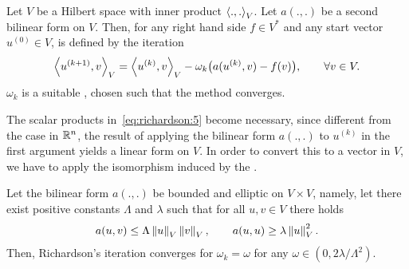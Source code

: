 \begin{definition}
  Let $V$ be a Hilbert space with inner product $\scal(.,.)_V$. Let
  $a(.,.)$ be a second bilinear form on $V$. Then, for any right hand
  side $f\in V^*$ and any start vector $u^{(0)}\in V$,
   is defined by the iteration
  \begin{gather}
    \label{eq:richardson:5}
    \scal(u^{(k+1)},v)_V = \scal(u^{(k)},v)_V
    - \omega_k \bigl(a(u^{(k)},v) - f(v)\bigr), \qquad \forall v\in V.
  \end{gather}
  $\omega_k$ is a suitable , chosen
  such that the method converges.
\end{definition}

\begin{note}
  The scalar products in~\eqref{eq:richardson:5} become necessary,
  since different from the case in $\mathbb R^n$, the result of applying the
  bilinear form $a(.,.)$ to $u^{(k)}$ in the first argument yields a
  linear form on $V$. In order to convert this to a vector in $V$, we
  have to apply the isomorphism induced by the .
\end{note}

\begin{theorem}
  \label{theorem:richardson:2}
  Let the bilinear form $a(.,.)$ be bounded and elliptic on $V\times
  V$, namely, let there exist positive constants $\Lambda$ and $\lambda$ such
  that for all $u,v\in V$ there holds
  \begin{gather}
    \label{eq:richardson:6}
    a(u,v) \le \Lambda \left\|u\right\|_V \left\|v\right\|_V,
    \qquad
    a(u,u) \ge \lambda \left\|u\right\|_V^2.
  \end{gather}
  Then, Richardson's iteration converges for
  $\omega_k = \omega$ for any $\omega \in (0, 2\lambda/\Lambda^2)$.
\end{theorem}

